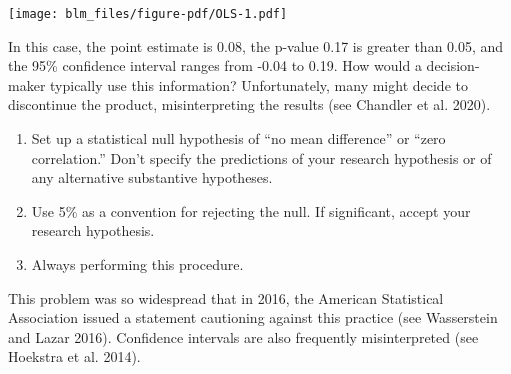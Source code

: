 \documentclass[
  letterpaper,
  DIV=11,
  numbers=noendperiod]{scrreprt}
\providecommand{\tightlist}{%
  \setlength{\itemsep}{0pt}\setlength{\parskip}{0pt}}\usepackage{longtable,booktabs,array}
\begin{document}
\texttt{[image: blm\_files/figure-pdf/OLS-1.pdf]}

In this case, the point estimate is 0.08, the p-value 0.17 is greater
than 0.05, and the 95\% confidence interval ranges from -0.04 to 0.19.
How would a decision-maker typically use this information?
Unfortunately, many might decide to discontinue the product,
misinterpreting the results (see Chandler et al. 2020).

\begin{tcolorbox}[enhanced jigsaw, colframe=quarto-callout-important-color-frame, left=2mm, toprule=.15mm, colbacktitle=quarto-callout-important-color!10!white, title=\textcolor{quarto-callout-important-color}{\faExclamation}\hspace{0.5em}{The null ritual, @gigerenzer2004null:}, coltitle=black, rightrule=.15mm, leftrule=.75mm, colback=white, arc=.35mm, bottomtitle=1mm, bottomrule=.15mm, breakable, titlerule=0mm, opacitybacktitle=0.6, toptitle=1mm, opacityback=0]

\begin{enumerate}
\def\labelenumi{\arabic{enumi}.}
\tightlist
\item
  Set up a statistical null hypothesis of ``no mean difference'' or
  ``zero correlation.'' Don't specify the predictions of your research
  hypothesis or of any alternative substantive hypotheses.
\item
  Use 5\% as a convention for rejecting the null. If significant, accept
  your research hypothesis.
\item
  Always performing this procedure.
\end{enumerate}

\end{tcolorbox}

This problem was so widespread that in 2016, the American Statistical
Association issued a statement cautioning against this practice (see
Wasserstein and Lazar 2016). Confidence intervals are also frequently
misinterpreted (see Hoekstra et al. 2014).
\end{document}

